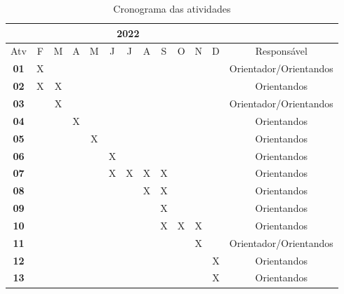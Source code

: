 \begin{table*}[ht]
\centering
\caption{Cronograma das atividades}
\label{tab:cronograma}
\begin{tabular}{|c|c|c|c|c|c|c|c|c|c|c|c|c|}
\hline & \multicolumn{11}{|c|}{2022} & \multicolumn{1}{|c|}{} \\
\hline \multicolumn{1}{|c|}{Atv} & F & M & A & M & J & J & A & S & O & N & D & {Responsável} \\
\hline \textbf{01} & X& & & & & & & & & & & Orientador/Orientandos \\
\hline \textbf{02} & X& X& & & & & & & & & & Orientandos \\
\hline \textbf{03} & & X& & & & & & & & & & Orientador/Orientandos\\
\hline \textbf{04} & & & X& & & & & & & & & Orientandos \\
\hline \textbf{05} & & & & X& & & & & & & & Orientandos \\
\hline \textbf{06} & & & & & X& & & & & & & Orientandos \\
\hline \textbf{07} & & & & & X& X& X& X& & & & Orientandos \\
\hline \textbf{08} & & & & & & & X& X& & & & Orientandos \\
\hline \textbf{09} & & & & & & & & X& & & & Orientandos \\
\hline \textbf{10} & & & & & & & & X& X & X & & Orientandos \\
\hline \textbf{11} & & & & & & & & & & X & & Orientador/Orientandos \\
\hline \textbf{12} & & & & & & & & & & & X & Orientandos \\
\hline \textbf{13} & & & & & & & & & & & X & Orientandos \\
\hline
\end{tabular} 
\end{table*}


